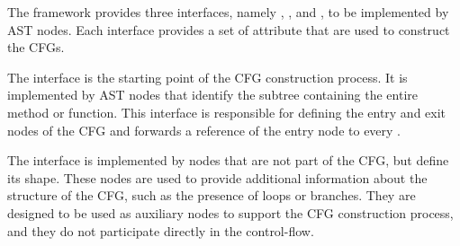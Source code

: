 The framework provides three interfaces, namely , , and ,
to be implemented by AST nodes. Each interface provides a set of attribute that are used to construct
the CFGs.

The  interface is the starting point of the CFG construction process.
It is implemented by AST nodes that identify the subtree containing the entire method 
or function. This interface is responsible for defining the entry and exit nodes of the CFG and 
forwards a reference of the entry node to every .


The  interface is implemented by nodes that are not part of the CFG,
but define its shape. These nodes are used to provide additional information 
about the structure of the CFG, such as the presence of loops or branches. 
They are designed to be used as auxiliary nodes to support the CFG construction 
process, and they do not participate directly in the control-flow.